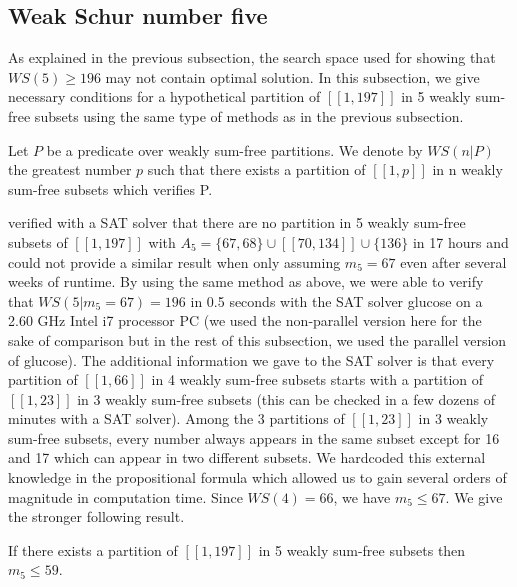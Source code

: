 \subsection{Weak Schur number five}
As explained in the previous subsection, the search space used for showing that \(WS(5) \geqslant 196\) may not contain
optimal solution. In this subsection,
we give necessary conditions for a hypothetical partition of \([\![1,197]\!]\) in 5 weakly sum-free subsets using the
same type of methods as in the
previous subsection.

\begin{notation}
Let \(P\) be a predicate over weakly sum-free partitions. We denote by \(WS(n | P)\) the greatest number \(p\) such that
there exists a partition of
\([\![1,p]\!]\) in n weakly sum-free subsets which verifies P.
\end{notation}

\par
\cite{ELIAHOU2012175} verified with a SAT solver that there are no partition in 5 weakly sum-free subsets of
\([\![1,197]\!]\) with
\(A_5 = \{67, 68\} \cup [\![70,134]\!] \cup \{136\}\) in 17 hours and could not provide a similar result when only
assuming \(m_5 = 67\) even after several
weeks of runtime. By using the same method as above, we were able to verify that \(WS(5 | m_5 = 67) = 196\) in 0.5
seconds with the SAT solver glucose \cite{Glucose}
on a 2.60 GHz Intel i7 processor PC (we used the non-parallel version here for the sake of comparison but in the rest of
this subsection, we used the parallel version of glucose).
The additional information we gave to the SAT solver is that every partition of \([\![1,66]\!]\) in 4 weakly sum-free
subsets starts with a partition of
\([\![1,23]\!]\) in 3 weakly sum-free subsets (this can be checked in a few dozens of minutes with a SAT solver). Among
the 3 partitions of \([\![1,23]\!]\) in
3 weakly sum-free subsets, every number always appears in the same subset except for 16 and 17 which can appear in two
different subsets. We hardcoded
this external knowledge in the propositional formula which allowed us to gain several orders of magnitude in computation
time. Since \(WS(4) = 66\), we have \(m_5 \leqslant 67\). We give the stronger following result.

\begin{computational theorem}
If there exists a partition of \([\![1,197]\!]\) in 5 weakly sum-free subsets then \(m_5 \leqslant 59\).
\end{computational theorem}

